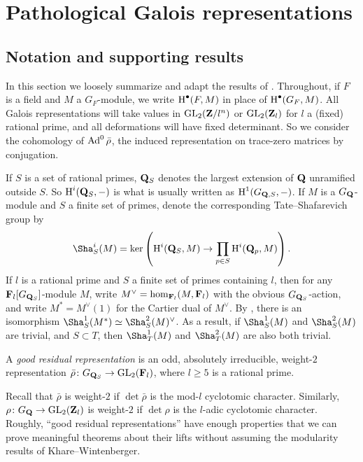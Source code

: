 
\chapter{Pathological Galois representations}\label{ch:construct-Galois}





\section{Notation and supporting results}

In this section we loosely summarize and adapt the results of 
\cite{khare-larsen-ramakrishna-2005,pande-2011}. Throughout, if $F$ is a field 
and $M$ a $G_F$-module, we write $\operatorname{H}^\bullet(F,M)$ in place of 
$\operatorname{H}^\bullet(G_F,M)$. All Galois representations will take values in 
$\operatorname{GL}_2(\mathbf{Z}/l^n)$ or $\operatorname{GL}_2(\mathbf{Z}_l)$ for $l$ a (fixed) rational prime, and 
all deformations will have fixed determinant. So we consider the cohomology of 
$\operatorname{Ad}^0\bar\rho$, the induced representation on trace-zero matrices by 
conjugation. 

If $S$ is a set of rational primes, $\mathbf{Q}_S$ denotes the largest extension of 
$\mathbf{Q}$ unramified outside $S$. So $\operatorname{H}^i(\mathbf{Q}_S,-)$ is what is usually written as 
$\operatorname{H}^1(G_{\mathbf{Q},S},-)$. If $M$ is a $G_{\mathbf{Q}}$-module and $S$ a finite set of primes, 
denote the corresponding Tate--Shafarevich group by 
\[
	\Sha^i_S(M) = \ker\left( \h^i(\bQ_S,M) \to \prod_{p\in S} \h^i(\bQ_p,M)\right) .
\]
If $l$ is a rational prime and $S$ a finite set of primes containing $l$, then 
for any $\mathbf{F}_l[G_{\mathbf{Q}_S}]$-module $M$, write $M^\vee=\hom_{\mathbf{F}_l}(M,\mathbf{F}_l)$ 
with the obvious $G_{\mathbf{Q}_S}$-action, and write $M^\ast = M^\vee(1)$ for the 
Cartier dual of $M^\vee$. By \cite[Th.~8.6.7]{neukirch-schmidt-winberg-2008}, 
there is an isomorphism $\Sha^1_S(M^\ast) \simeq \Sha_S^2(M)^\vee$. As a 
result, if $\Sha_S^1(M)$ and $\Sha_S^2(M)$ are trivial, and $S\subset T$, then 
$\Sha_T^1(M)$ and $\Sha_T^2(M)$ are also both trivial. 
 
\begin{definition}
A \emph{good residual representation} is an odd, absolutely irreducible, 
weight-$2$ representation $\bar\rho\colon G_{\mathbf{Q}_S} \to \operatorname{GL}_2(\mathbf{F}_l)$, where 
$l\geqslant 5$ is a rational prime. 
\end{definition}

Recall that $\bar\rho$ is weight-$2$ if $\det\bar\rho$ is the mod-$l$ 
cyclotomic character. Similarly, $\rho\colon G_{\mathbf{Q}} \to \operatorname{GL}_2(\mathbf{Z}_l)$ is 
weight-$2$ if $\det\rho$ is the $l$-adic cyclotomic character. 
Roughly, ``good residual representations'' have enough properties that we can 
prove meaningful theorems about their lifts without assuming the modularity 
results of Khare--Wintenberger. 

